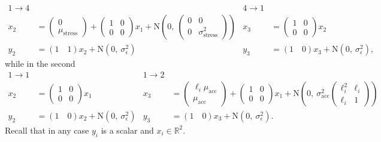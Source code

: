 \documentclass[aoas]{imsart}
\begin{document}
\begin{equation*}
  \begin{aligned} 1\rightarrow 4 && 4\rightarrow 1\\ x_{2}
    &= \begin{pmatrix} 0\\ \mu_{\textrm{stress}} \end{pmatrix}
    + \begin{pmatrix}1&0\\0&0\end{pmatrix} x_{1} +
    \mbox{N}\left(0,\ \begin{pmatrix}0&0\\0&\sigma_{\textrm{stress}}^2\end{pmatrix}\right)
    & x_{3} &=
    \begin{pmatrix}1&0\\0&0\end{pmatrix} x_{2} \\ y_2 &= (1\quad 1) x_2
    + \mbox{N}(0,\ \sigma_\epsilon^2) & y_3 &= (1\quad 0) x_3 +
    \mbox{N}(0,\ \sigma_\epsilon^2),
  \end{aligned}
\end{equation*}
while in the second
\begin{equation*}
  \begin{aligned} 1\rightarrow 1 && 1\rightarrow 2\\ x_{2} &=
    \begin{pmatrix}1&0\\0&0\end{pmatrix} x_{1} & x_{3}
    &= \begin{pmatrix} \ell_i\mu_{\textrm{acc}}\\
      \mu_{\textrm{acc}}\end{pmatrix} +
    \begin{pmatrix}1&0\\0&0\end{pmatrix} x_{1} + \mbox{N}\left(0,\
      \sigma_{\textrm{acc}}^2\begin{pmatrix} \ell_i^2 & \ell_i\\ \ell_i &
        1 \end{pmatrix}\right)\\ y_2 &= (1\quad 0) x_2 + \mbox{N}(0,\
    \sigma_\epsilon^2) & y_3 &= (1\quad 0) x_3 + \mbox{N}(0,\
    \sigma_\epsilon^2).
  \end{aligned}
\end{equation*}
Recall that in any case $y_i$ is a scalar and $x_i \in \mathbb{R}^2$.
\end{document}
